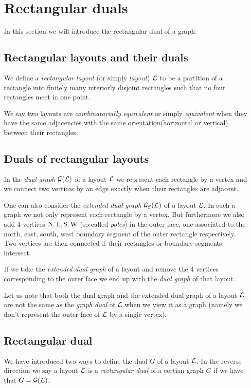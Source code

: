 
\section{Rectangular duals}
\newcommand{\G}{\scr G}
\renewcommand{\L}{\scr L}

In this section we will introduce the rectangular dual of a graph.

\subsection{Rectangular layouts and their duals}
  We define a \emph{rectangular layout} (or simply \emph{layout}) $\L$ to be a partition of a rectangle into finitely many interiorly disjoint rectangles such that no four rectangles meet in one point.

  We say two layouts are  \emph{combinatorially equivalent} or simply \emph{equivalent} when they have the same adjacencies with the same orientation(horizontal or vertical) between their rectangles.

\subsection{Duals of rectangular layouts}
  In the \emph{dual graph} $\dualgraph{\L}$ of a layout $\L$ we represent each rectangle by a vertex and we connect two vertices by an edge exactly when their rectangles are adjacent.

  One can also consider the \emph{extended dual graph} $\extdualgraph{\L}$ of a layout $\L$. In such a graph we not only represent each rectangle by a vertex. But furthermore we also add $4$ vertices $\mathrm{N}, \mathrm{E}, \mathrm{S}, \mathrm{W}$ (so-called \emph{poles}) in the outer face, one associated to the north, east, south, west boundary segment of the outer rectangle respectively. Two vertices are then connected if their rectangles or boundary segments intersect.

  If we take the \emph{extended dual graph} of a layout and remove the $4$ vertices corresponding to the outer face we end up with the \emph{dual graph} of that layout.

  Let us note that both the dual graph and the extended dual graph of a layout $\L$ are not the same as the \emph{graph dual} of $\L$ when we view it as a graph (namely we don't represent the outer face of $\L$ by a single vertex).

\subsection{Rectangular dual}
  We have introduced two ways to define the dual $G$ of a layout $\L$. In the reverse direction we say a layout $\L$ is a \emph{rectangular dual} of a certian graph $G$ if we have that $G = \dualgraph{\L}$.

